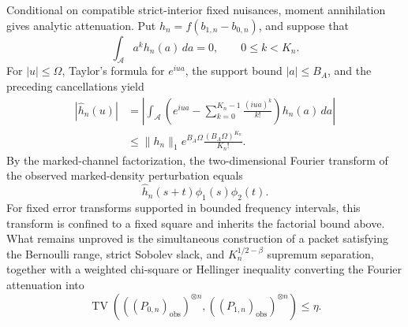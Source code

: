 Conditional on compatible strict-interior fixed nuisances, moment annihilation gives analytic attenuation. Put \(h_n=f(b_{1,n}-b_{0,n})\), and suppose that
\[
 \int_{\mathcal A}a^k h_n(a)\,da=0,
 \qquad 0\le k<K_n.
\]
For \(|u|\le\Omega\), Taylor's formula for \(e^{iua}\), the support bound \(|a|\le B_A\), and the preceding cancellations yield
\[
 \begin{aligned}
 |\widehat h_n(u)|
 &=\left|\int_{\mathcal A}
     \left(e^{iua}-\sum_{k=0}^{K_n-1}\frac{(iua)^k}{k!}\right)
     h_n(a)\,da\right|\\
 &\le \|h_n\|_1 e^{B_A\Omega}
       \frac{(B_A\Omega)^{K_n}}{K_n!}.
 \end{aligned}
\]
By the marked-channel factorization, the two-dimensional Fourier transform of the observed marked-density perturbation equals
\[
 \widehat h_n(s+t)\phi_1(s)\phi_2(t).
\]
For fixed error transforms supported in bounded frequency intervals, this transform is confined to a fixed square and inherits the factorial bound above. What remains unproved is the simultaneous construction of a packet satisfying the Bernoulli range, strict Sobolev slack, and \(K_n^{1/2-\beta}\) supremum separation, together with a weighted chi-square or Hellinger inequality converting the Fourier attenuation into
\[
 \operatorname{TV}\!\left(((P_{0,n})_{\mathrm{obs}})^{\otimes n},
 ((P_{1,n})_{\mathrm{obs}})^{\otimes n}\right)\le\eta.
\]
